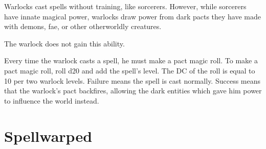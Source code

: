 Warlocks cast spells without training, like sorcerers.
However, while sorcerers have innate magical power, warlocks draw power from dark pacts they have made with demons, fae, or other otherworldly creatures.

 The warlock does not gain this ability.

 Every time the warlock casts a spell, he must make a pact magic roll.
To make a pact magic roll, roll d20 and add the spell's level.
The DC of the roll is equal to 10  per two warlock levels.
Failure means the spell is cast normally.
Success means that the warlock's pact backfires, allowing the dark entities which gave him power to influence the world instead.

\section{Spellwarped}
